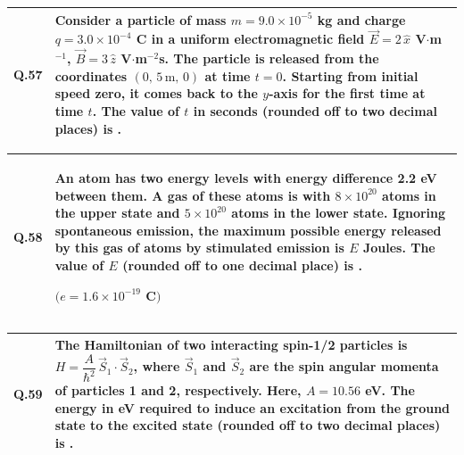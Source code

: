 \documentclass[12pt,a4paper]{article}
\begin{document}
\newpage

\begin{table}[h!]
\begin{tabular}{|p{}|p{}|}
\hline
\textbf{Q.57} &
Consider a particle of mass $m = 9.0 \times 10^{-5}$ kg and charge $q = 3.0 \times 10^{-4}$ C in a uniform electromagnetic field $\vec{E} = 2\,\hat{x}$ V$\cdot$m$^{-1}$, $\vec{B} = 3\,\hat{z}$ V$\cdot$m$^{-2}$s. The particle is released from the coordinates $(0,\,5\,\text{m},\,0)$ at time $t = 0$. Starting from initial speed zero, it comes back to the $y$-axis for the first time at time $t$. The value of $t$ in seconds (rounded off to two decimal places) is \underline{\hspace{1.5cm}}. \\
\hline
\end{tabular}
\end{table}

\bigskip

\begin{table}[h!]
\begin{tabular}{|p{}|p{}|}
\hline
\textbf{Q.58} &
An atom has two energy levels with energy difference 2.2 eV between them. A gas of these atoms is with $8 \times 10^{20}$ atoms in the upper state and $5 \times 10^{20}$ atoms in the lower state. Ignoring spontaneous emission, the maximum possible energy released by this gas of atoms by stimulated emission is $E$ Joules. The value of $E$ (rounded off to one decimal place) is \underline{\hspace{1.5cm}}.

\medskip
$(e = 1.6 \times 10^{-19}$ C$)$ \\
\hline
\end{tabular}
\end{table}

\bigskip

\begin{table}[h!]
\begin{tabular}{|p{}|p{}|}
\hline
\textbf{Q.59} &
The Hamiltonian of two interacting spin-1/2 particles is $H = \dfrac{A}{\hbar^2}\,\vec{S}_1 \cdot \vec{S}_2$, where $\vec{S}_1$ and $\vec{S}_2$ are the spin angular momenta of particles 1 and 2, respectively. Here, $A = 10.56$ eV. The energy in eV required to induce an excitation from the ground state to the excited state (rounded off to two decimal places) is \underline{\hspace{1.5cm}}. \\
\hline
\end{tabular}
\end{table}
\end{document}
